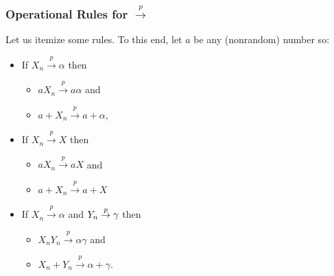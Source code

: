 \documentclass[notes=show,smaller,handout]{beamer}
\newenvironment{stepitemize}{\begin{itemize}[<+->]}{\end{itemize} }
\begin{document}
\begin{frame}%

\frametitle{Operational Rules for $\overset{p}{\rightarrow }$}
Let us itemize some rules. To this end, let $a$ be any (nonrandom) number so:


\begin{stepitemize}
\item If $X_{n}\overset{p}{\rightarrow }%
\alpha $ then \vspace{0.3cm}
\begin{stepitemize}
\item $aX_{n}\overset{p}{\rightarrow }a\alpha $ and \vspace{0.3cm}
\item $a+X_{n}\overset{p}{\rightarrow }a+\alpha$,
\end{stepitemize}

\vspace{0.4cm}
\item If $X_{n}\overset{p}{\rightarrow }X $ then \vspace{0.3cm}
\begin{stepitemize}
\item $aX_{n}\overset{p}{\rightarrow }aX $ and \vspace{0.6cm}
\item $a+X_{n}\overset{p}{\rightarrow }a+X $
\end{stepitemize}

\vspace{0.4cm}
\item If $X_{n}\overset{p}{\rightarrow }\alpha $ and $Y_{n}\overset{p}{%
\rightarrow }\gamma $ then \vspace{0.3cm}
\begin{stepitemize}
\item $X_{n}Y_{n}\overset{p}{\rightarrow }\alpha \gamma$ and \vspace{0.3cm}
\item $X_{n}+Y_{n}\overset{p}{\rightarrow }\alpha +\gamma$.
\end{stepitemize}

\end{stepitemize}

\end{frame}%
\end{document}
